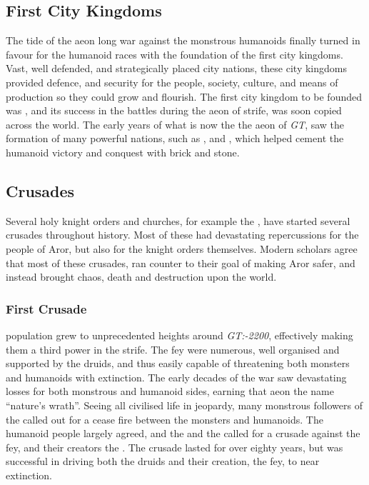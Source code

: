 \subsection{First City Kingdoms}

The tide of the aeon long war against the monstrous humanoids finally turned
in favour for the humanoid races with the foundation of the first city
kingdoms.  Vast, well defended, and strategically placed city nations, these
city kingdoms provided defence, and security for the people, society, culture,
and means of production so they could grow and flourish. The first city
kingdom to be founded was , and its success in the
battles during the aeon of strife, was soon copied across the world.  The
early years of what is now the the aeon of \emph{GT}, saw the formation of
many powerful nations, such as , 
and , which helped cement the humanoid victory and
conquest with brick and stone.

\subsection{Crusades}
\label{sec:Crusades}

Several holy knight orders and churches, for example the , have started several crusades throughout history. Most of
these had devastating repercussions for the people of Aror, but also for the
knight orders themselves. Modern scholars agree that most of these crusades,
ran counter to their goal of making Aror safer, and instead brought chaos,
death and destruction upon the world.

\subsubsection{First Crusade}
\label{sec:First Crusade}

 population grew to unprecedented heights around
\emph{GT:-2200}, effectively making them a third power in the strife. The fey
were numerous, well organised and supported by the druids, and thus easily
capable of threatening both monsters and humanoids with extinction. The early
decades of the war saw devastating losses for both monstrous and humanoid
sides, earning that aeon the name ``nature's wrath''. Seeing all civilised
life in jeopardy, many monstrous followers of the 
called out for a cease fire between the monsters and humanoids. The humanoid
people largely agreed, and the  and the
 called for a crusade against the fey, and their
creators the . The crusade lasted for over eighty years,
but was successful in driving both the druids and their creation, the fey, to
near extinction.

